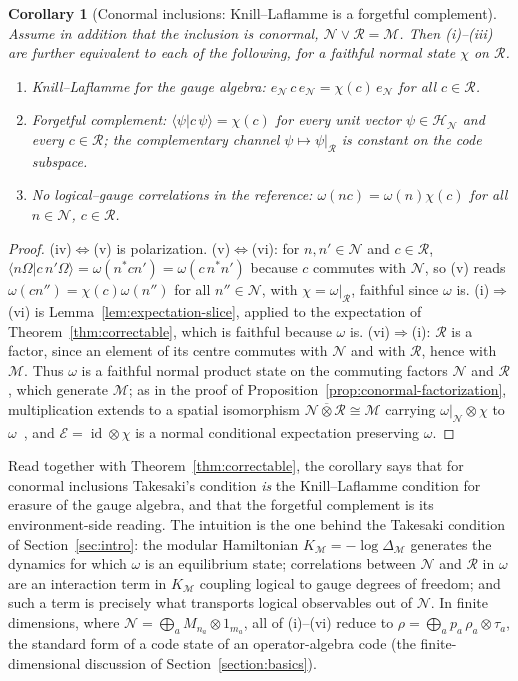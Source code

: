 \documentclass[a4paper,11pt]{article}
\newtheorem{corollary}[theorem]{Corollary}
\theoremstyle{definition}
\newcommand{\mR}{\mathcal{R}}
\newcommand{\mN}{\mathcal{N}}
\newcommand{\mH}{\mathcal{H}}
\newcommand{\mM}{\mathcal{M}}
\newcommand{\mE}{\mathcal{E}}
\begin{document}
\begin{corollary}[Conormal inclusions: Knill--Laflamme is a forgetful complement]\label{cor:KL-conormal}
Assume in addition that the inclusion is conormal, $\mN\vee\mR=\mM$. Then {\rm(i)--(iii)} are further equivalent to each of the following, for a faithful normal state $\chi$ on $\mR$.
\begin{enumerate}
 \item[\rm(iv)] \emph{Knill--Laflamme for the gauge algebra:} $e_{\mN}\,c\,e_{\mN}=\chi(c)\,e_{\mN}$ for all $c\in\mR$.
 \item[\rm(v)] \emph{Forgetful complement:} $\langle\psi|c\,\psi\rangle=\chi(c)$ for every unit vector $\psi\in\mH_{\mN}$ and every $c\in\mR$; the complementary channel $\psi\mapsto\psi|_{\mR}$ is constant on the code subspace.
 \item[\rm(vi)] \emph{No logical--gauge correlations in the reference:} $\omega(nc)=\omega(n)\chi(c)$ for all $n\in\mN$, $c\in\mR$.
\end{enumerate}
\end{corollary}

\begin{proof}
(iv)$\Leftrightarrow$(v) is polarization. (v)$\Leftrightarrow$(vi): for $n,n'\in\mN$ and $c\in\mR$, $\langle n\Omega|c\,n'\Omega\rangle=\omega(n^*cn')=\omega(c\,n^*n')$ because $c$ commutes with $\mN$, so (v) reads $\omega(cn'')=\chi(c)\omega(n'')$ for all $n''\in\mN$, with $\chi=\omega|_{\mR}$, faithful since $\omega$ is. (i)$\Rightarrow$(vi) is Lemma~\ref{lem:expectation-slice}, applied to the expectation of Theorem~\ref{thm:correctable}, which is faithful because $\omega$ is. (vi)$\Rightarrow$(i): $\mR$ is a factor, since an element of its centre commutes with $\mN$ and with $\mR$, hence with $\mM$. Thus $\omega$ is a faithful normal product state on the commuting factors $\mN$ and $\mR$, which generate $\mM$; as in the proof of Proposition~\ref{prop:conormal-factorization}, multiplication extends to a spatial isomorphism $\mN\overline\otimes\mR\cong\mM$ carrying $\omega|_{\mN}\otimes\chi$ to $\omega$~\cite{DoplicherLongo1984}, and $\mE=\operatorname{id}\otimes\chi$ is a normal conditional expectation preserving $\omega$.
\end{proof}

Read together with Theorem~\ref{thm:correctable}, the corollary says that for conormal inclusions Takesaki's condition \emph{is} the Knill--Laflamme condition for erasure of the gauge algebra, and that the forgetful complement is its environment-side reading. The intuition is the one behind the Takesaki condition of Section~\ref{sec:intro}: the modular Hamiltonian $K_{\mM}=-\log\Delta_{\mM}$ generates the dynamics for which $\omega$ is an equilibrium state; correlations between $\mN$ and $\mR$ in $\omega$ are an interaction term in $K_{\mM}$ coupling logical to gauge degrees of freedom; and such a term is precisely what transports logical observables out of $\mN$. In finite dimensions, where $\mN=\bigoplus_aM_{n_a}\otimes1_{m_a}$, all of (i)--(vi) reduce to $\rho=\bigoplus_ap_a\,\rho_a\otimes\tau_a$, the standard form of a code state of an operator-algebra code (the finite-dimensional discussion of Section~\ref{section:basics}).
\end{document}
